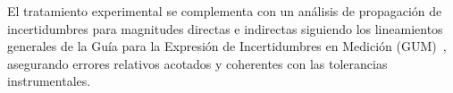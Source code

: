 El tratamiento experimental se complementa con un análisis de propagación de incertidumbres para magnitudes directas e indirectas siguiendo los lineamientos generales de la Guía para la Expresión de Incertidumbres en Medición (GUM)~\cite{gum, taylor}, asegurando errores relativos acotados y coherentes con las tolerancias instrumentales.